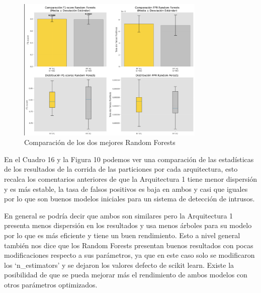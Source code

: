 \documentclass[12pt,a4paper]{article}
\begin{document}
\begin{figure}[H]
  \centering
  \includegraphics[width=0.8\textwidth]{../img/ComparacionRandomForest.png}
  \caption{Comparación de los dos mejores Random Forests}\label{fig:comparison-random-forest}
\end{figure}

En el Cuadro 16 y la Figura 10 podemos ver una comparación de las estadísticas de los resultados de la corrida
de las particiones por cada arquitectura, esto recalca los comentarios anteriores de que la Arquitectura 1 tiene menor
dispersión y es más estable, la tasa de falsos positivos es baja en ambos y casi que iguales por lo que
son buenos modelos iniciales para un sistema de detección de intrusos.

En general se podría decir que ambos son similares pero la Arquitectura 1 presenta menos dispersión en los resultados
y usa menos árboles para su modelo por lo que es más eficiente y tiene un buen rendimiento. Esto a nivel general
también nos dice que los Random Forests presentan buenos resultados con pocas modificaciones respecto a sus parámetros,
ya que en este caso solo se modificaron los `n_estimators' y se dejaron los valores defecto de scikit learn.
Existe la posibilidad de que se pueda mejorar más el rendimiento de ambos modelos con otros parámetros optimizados.

{\tiny
  \printbibliography[title={Referencias}]
}
\end{document}
